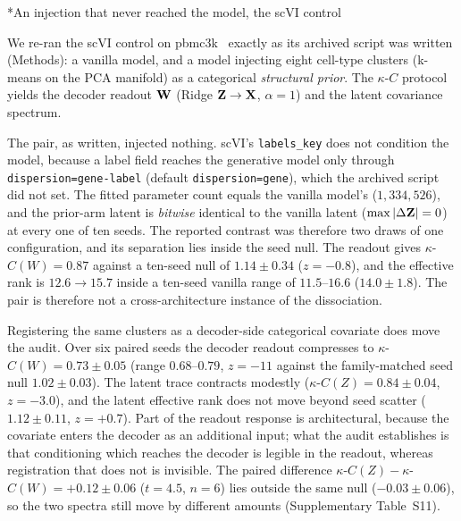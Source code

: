 \documentclass[11pt,a4paper]{article}
\makeatletter
\renewcommand{\subsection}{\@startsection{subsection}{2}{0pt}{10pt plus 4pt}{4pt}{\normalsize\bfseries}}
\makeatother
\begin{document}
\subsection*{An injection that never reached the model, the scVI control}
\label{sec:benchmark}

We re-ran the scVI control on pbmc3k~\cite{zheng2017} exactly as its archived script was written (Methods): a vanilla model, and a model injecting eight cell-type clusters (k-means on the PCA manifold) as a categorical \emph{structural prior}. The $\kappa$-$C$ protocol yields the decoder readout $\mathbf{W}$ (Ridge $\mathbf{Z}\to\mathbf{X}$, $\alpha=1$) and the latent covariance spectrum.

The pair, as written, injected nothing. scVI's \texttt{labels\_key} does not condition the model, because a label field reaches the generative model only through \texttt{dispersion=gene-label} (default \texttt{dispersion=gene}), which the archived script did not set. The fitted parameter count equals the vanilla model's ($1{,}334{,}526$), and the prior-arm latent is \emph{bitwise} identical to the vanilla latent ($\max|\Delta\mathbf{Z}|=0$) at every one of ten seeds. The reported contrast was therefore two draws of one configuration, and its separation lies inside the seed null. The readout gives $\kappa$-$C(W)=0.87$ against a ten-seed null of $1.14\pm0.34$ ($z=-0.8$), and the effective rank is $12.6\to15.7$ inside a ten-seed vanilla range of $11.5$--$16.6$ ($14.0\pm1.8$). The pair is therefore not a cross-architecture instance of the dissociation.

Registering the same clusters as a decoder-side categorical covariate does move the audit. Over six paired seeds the decoder readout compresses to $\kappa$-$C(W)=0.73\pm0.05$ (range $0.68$--$0.79$, $z=-11$ against the family-matched seed null $1.02\pm0.03$). The latent trace contracts modestly ($\kappa$-$C(Z)=0.84\pm0.04$, $z=-3.0$), and the latent effective rank does not move beyond seed scatter ($1.12\pm0.11$, $z=+0.7$). Part of the readout response is architectural, because the covariate enters the decoder as an additional input; what the audit establishes is that conditioning which reaches the decoder is legible in the readout, whereas registration that does not is invisible. The paired difference $\kappa$-$C(Z)-\kappa$-$C(W)=+0.12\pm0.06$ ($t=4.5$, $n=6$) lies outside the same null ($-0.03\pm0.06$), so the two spectra still move by different amounts (Supplementary Table~S11).
\end{document}

